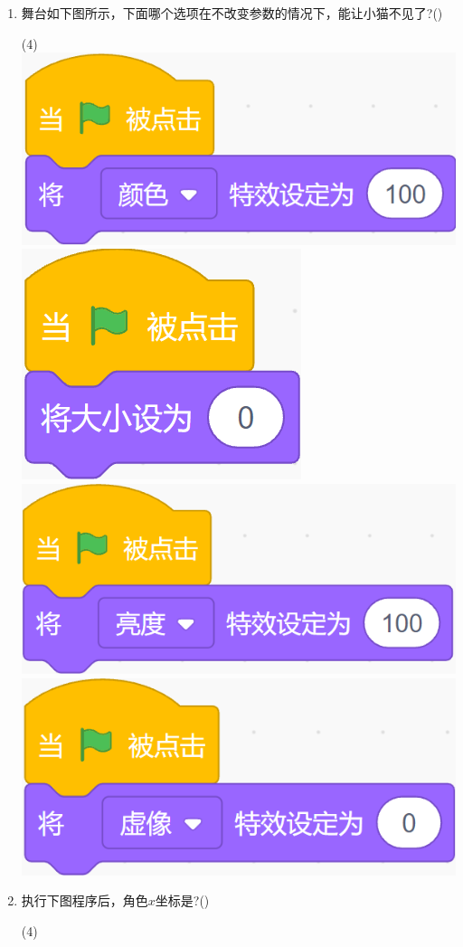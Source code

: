 \documentclass[10pt, a4paper]{article}
\begin{document}
\begin{enumerate}
        \item 舞台如下图所示，下面哪个选项在不改变参数的情况下，能让小猫不见了?(\qquad)
        \begin{tasks}(4)
            \task \includegraphics[width=.16\textwidth]{11a.png}
            \task \includegraphics[width=.08\textwidth]{11b.png}
            \task \includegraphics[width=.16\textwidth]{11c.png}
            \task \includegraphics[width=.16\textwidth]{11d.png}
        \end{tasks}

        \item 执行下图程序后，角色$x$坐标是?(\qquad)
        \begin{tasks}(4)
        \end{tasks}


\end{enumerate}
\end{document}

